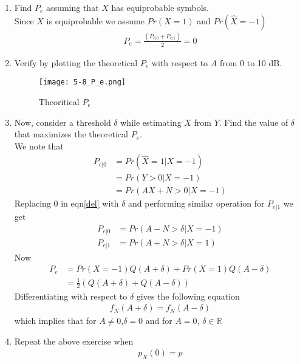 \documentclass[journal,12pt,twocolumn]{IEEEtran}
\renewcommand\thesection{\arabic{section}}
\begin{document}
\begin{enumerate}[label=\thesection.\arabic*
,ref=\thesection.\theenumi]
If $N < 0, f_A(x) = 0$. then 
\begin{align}
    P_{e|1} = 0
\end{align}

\item Find $P_e$ assuming that $X$ has equiprobable symbols.\\
%
\solution Since $X$ is equiprobable we assume $Pr(X = 1)$ and $Pr(\hat{X}=-1)$\\
\begin{align}
    P_e = \frac{(P_{e|0}+P_{e|1})}{2} = 0
\end{align}
\item
Verify by plotting  the theoretical $P_e$ with respect to $A$ from 0 to 10 dB.\\  
%
\solution
\begin{figure}[h]
    \centering
    \texttt{[image: 5-8\_P\_e.png]}
    \caption{Theoritical $P_e$}
    \label{fig:5-8_p_e}
\end{figure}
\item Now, consider a threshold $\delta$  while estimating $X$ from $Y$. Find the value of $\delta$ that maximizes the theoretical $P_e$.\\
\solution
We note that 
\begin{align}
    P_{e|0}&= Pr(\hat{X}=1|X=-1)\\
    &= Pr(Y>0|X=-1)\\ \label{del}
    &= Pr(AX+N>0 |X=-1)
\end{align}
Replacing 0 in eqn\eqref{del} with $\delta$ and performing similar operation for $P_{e|1}$ we get 
\begin{align}
    P_{e|0} &= Pr(A-N>\delta|X=-1)\\
    P_{e|1} &= Pr(A+N>\delta|X=1)
\end{align}
Now 
\begin{align}
    P_e &= Pr(X =-1)Q(A+\delta) +Pr(X=1)Q(A-\delta)\\
    &= \frac{1}{2}(Q(A+\delta)+Q(A-\delta))
\end{align}
Differentiating with respect to $\delta$ gives the following equation
\begin{align}
    f_N(A+\delta) = f_N(A-\delta)
\end{align}
which implies that for $A \neq 0$,$\delta = 0$ and for $A=0$, $\delta \in \mathbb{R}$
\item Repeat the above exercise when 
	\begin{align}
		p_{X}(0) = p
	\end{align}

\end{enumerate}
\end{document}
